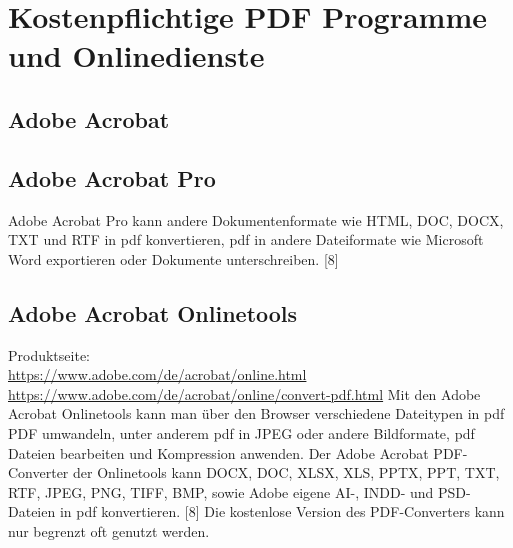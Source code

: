 \section{Kostenpflichtige PDF Programme und Onlinedienste}

\subsection{Adobe Acrobat}

\subsection{Adobe Acrobat Pro}
Adobe Acrobat Pro kann andere Dokumentenformate wie HTML, DOC, DOCX, TXT und RTF in \gls{pdf} konvertieren, \gls{pdf} in andere Dateiformate wie Microsoft Word exportieren oder Dokumente unterschreiben. [8]

\subsection{Adobe Acrobat Onlinetools}
Produktseite: \\
\url{https://www.adobe.com/de/acrobat/online.html} \\
\url{https://www.adobe.com/de/acrobat/online/convert-pdf.html}
Mit den Adobe Acrobat Onlinetools kann man über den Browser verschiedene Dateitypen in \gls{pdf} PDF umwandeln, unter anderem \gls{pdf} in JPEG oder andere Bildformate, \gls{pdf} Dateien bearbeiten und Kompression anwenden.
Der Adobe Acrobat PDF-Converter der Onlinetools kann DOCX, DOC, XLSX, XLS, PPTX, PPT, TXT, RTF, JPEG, PNG, TIFF, BMP, sowie Adobe eigene AI-, INDD- und PSD-Dateien in \gls{pdf} konvertieren. [8] Die kostenlose Version des PDF-Converters kann nur begrenzt oft genutzt werden.
